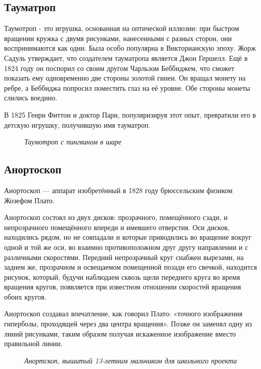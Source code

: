 \documentclass[a4paper, 12pt]{article}
\renewcommand{\sectionmark}[1]{\markright{#1}}
\newcommand{\image}[3]{
	\begin{figure}[ht]
		\center{\texttt{[image: img/\#1]} }
		\caption{\textit{#3}}\end{figure}
}
\begin{document}
\subsection{Тауматроп}

Таумотроп - это игрушка, основанная на оптической иллюзии: при
быстром вращении кружка с двумя рисунками, нанесенными с разных сторон,
они воспринимаются как один. Была особо популярна в Викторианскую эпоху.
Жорж Садуль утверждает, что создателем тауматропа является Джон
Гершелл. Ещё в 1824 году он поспорил со своим другом Чарльзом Беббиджем,
что сможет показать ему одновременно две стороны золотой гинеи. Он
вращал монету на ребре, а Беббиджа попросил поместить глаз на её уровне.
Обе стороны монеты слились воедино.

В 1825 Генри Фиттон и доктор Пари, популяризируя этот опыт, превратили
его в детскую игрушку, получившую имя тауматроп.

\image{Пингвин.jpg}{182}{Таумотроп с пингвином в шаре}

\subsection{Анортоскоп}

Анортоскоп — аппарат изобретённый в 1828 году брюссельским
физиком Жозефом Плато.

Анортоскоп состоял из двух дисков: прозрачного, помещённого сзади, и
непрозрачного помещённого впереди и имевшего отверстия. Оси дисков,
находились рядом, но не совпадали и которые приводились во вращение
вокруг одной и той же оси, во взаимно противоположном друг другу
направлении и с различными скоростями. Передний непрозрачный круг
снабжен вырезами, на заднем же, прозрачном и освещаемом помещенной
позади его свечкой, находится рисунок, который, будучи наблюдаем сквозь
щели переднего круга во время вращения кругов, появляется при известном
отношении скоростей вращения обоих кругов.

Анортоскоп создавал впечатление, как говорил Плато: «точного изображения
гиперболы, проходящей через два центра вращения». Позже он заменял одну
из линий рисунками, таким образом получая искаженное изображение вместо
правильной линии.

\image{С мышкой.jpg}{150}{Анортскоп, вышитый 13-летним мальчиком для школьного проекта}

\newpage
\thispagestyle{fancy}
\renewcommand{\sectionmark}[1]{\markright{#1}}
\fancyhf{}
\fancyhead[R]{\bfseries\thepage}
\end{document}
